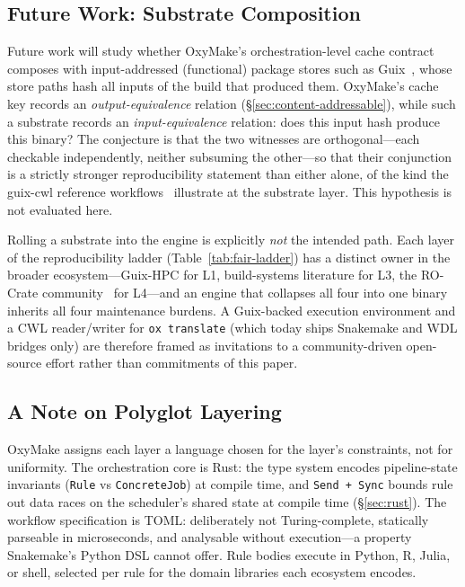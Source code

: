 \documentclass[12pt,a4paper]{article}
\newcommand{\code}[1]{{\texttt{\small\color{inlinecode}#1}}}
\begin{document}
\subsection{Future Work: Substrate Composition}
\label{sec:future-work}

Future work will study whether OxyMake's orchestration-level cache
contract composes with input-addressed (functional) package stores such
as Guix~\cite{courtesGuixHPCReproducible2015,dolstraPurelyFunctionalSoftware2006},
whose store paths hash all inputs of the build that produced them.
OxyMake's cache key records an \emph{output-equivalence} relation
(\S\ref{sec:content-addressable}), while such a substrate
records an \emph{input-equivalence} relation: does this input hash
produce this binary? The conjecture is that the two witnesses are
orthogonal---each checkable independently, neither subsuming the
other---so that their conjunction is a strictly stronger
reproducibility statement than either alone, of the kind the guix-cwl
reference workflows~\cite{prinsGuixCWLPipelines2018} illustrate at the
substrate layer. This hypothesis is not evaluated here.

Rolling a substrate into the engine is explicitly \emph{not} the
intended path. Each layer of the reproducibility ladder
(Table~\ref{tab:fair-ladder}) has a distinct owner in the broader
ecosystem---Guix-HPC for L1, build-systems literature for L3, the
RO-Crate community~\cite{soilandReyesPackagingResearch2022} for
L4---and an engine that collapses all four into one binary inherits
all four maintenance burdens. A Guix-backed execution environment and
a CWL reader/writer for \code{ox translate} (which today ships
Snakemake and WDL bridges only) are therefore framed as invitations to
a community-driven open-source effort rather than commitments of this
paper.

\subsection{A Note on Polyglot Layering}
\label{sec:language-material}

OxyMake assigns each layer a language chosen for the layer's
constraints, not for uniformity. The orchestration core is Rust:
the type system encodes pipeline-state invariants
(\code{Rule} vs \code{ConcreteJob}) at compile time, and \code{Send +
Sync} bounds rule out data races on the scheduler's shared state at
compile time (\S\ref{sec:rust}). The workflow specification is TOML: deliberately not
Turing-complete, statically parseable in microseconds, and analysable
without execution---a property Snakemake's Python DSL cannot offer.
Rule bodies execute in Python, R, Julia, or shell, selected per rule
for the domain libraries each ecosystem encodes.
\end{document}
